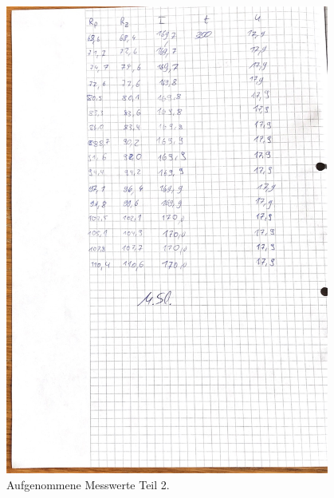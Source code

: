 \begin{figure}[h!]
  \centering
  \includegraphics[width=0.95\textwidth]{data/IMG_1282.JPG}
  \caption{Aufgenommene Messwerte Teil 2.}
  \label{fig:messwetrte2}
\end{figure}
